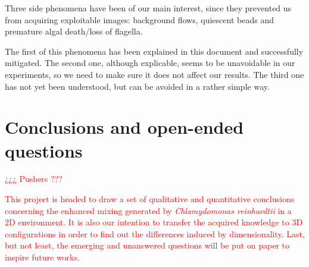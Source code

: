 Three side phenomena have been of our main interest, since they prevented us from acquiring exploitable images: background flows, quiescent beads and premature algal death/loss of flagella.

The first of this phenomena has been explained in this document and successfully mitigated. The second one, although explicable, seems to be unavoidable in our experiments, so we need to make sure it does not affect our results. The third one has not yet been understood, but can be avoided in a rather simple way.

\section{Conclusions and open-ended questions}

\textcolor{red}{¿¿¿ Pushers ???}

\textcolor{red}{This project is headed to draw a set of qualitative and quantitative conclusions concerning the enhanced mixing generated by \textit{Chlamydomonas reinhardtii} in a 2D environment. It is also our intention to transfer the acquired knowledge to 3D configurations in order to find out the differences induced by dimensionality. Last, but not least, the emerging and unanswered questions will be put on paper to inspire future works.}